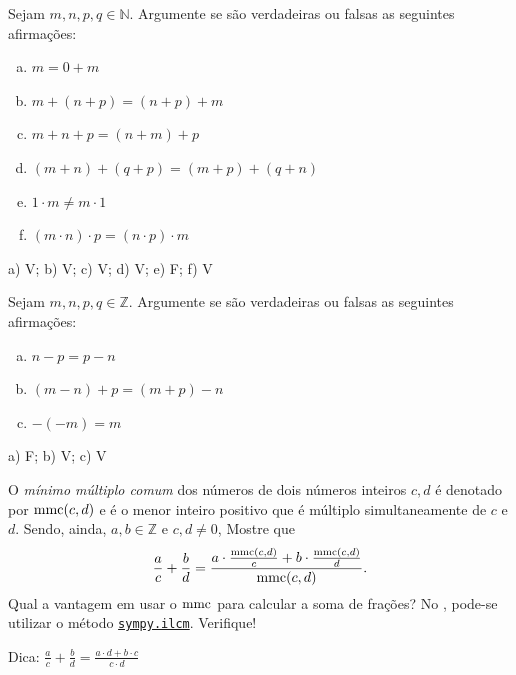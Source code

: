 \begin{exer}
  Sejam $m,n,p,q\in\mathbb{N}$. Argumente se são verdadeiras ou falsas as seguintes afirmações:
  \begin{enumerate}[a)]
  \item $m = 0 + m$
  \item $m + (n + p) = (n + p) + m$
  \item $m + n + p = (n + m) + p$
  \item $(m+n) + (q + p) = (m + p) + (q + n)$
  \item $1\cdot m \neq m\cdot 1$
  \item $(m\cdot n)\cdot p = (n\cdot p)\cdot m$
  \end{enumerate}
\end{exer}
\begin{resp}
  a) V; b) V; c) V; d) V; e) F; f) V
\end{resp}

\begin{exer}
  Sejam $m,n,p,q\in\mathbb{Z}$. Argumente se são verdadeiras ou falsas as seguintes afirmações:
  \begin{enumerate}[a)]
  \item $n - p = p - n$
  \item $(m - n) + p = (m + p) - n$
  \item $-(-m) = m$
  \end{enumerate}
\end{exer}
\begin{resp}
  a) F; b) V; c) V
\end{resp}

\begin{exer}
  O \emph{mínimo múltiplo comum} dos números de dois números inteiros $c,d$ é denotado por $\operatorname{mmc}(c,d)$ e é o menor inteiro positivo que é múltiplo simultaneamente de $c$ e $d$. Sendo, ainda, $a,b\in\mathbb{Z}$ e $c,d\neq 0$, Mostre que
  \begin{equation}
    \frac{a}{c} + \frac{b}{d} = \frac{a\cdot\frac{\operatorname{mmc}(c,d)}{c}+b\cdot\frac{\operatorname{mmc}(c,d)}{d}}{\operatorname{mmc}(c,d)}.
  \end{equation}
  Qual a vantagem em usar o $\operatorname{mmc}$ para calcular a soma de frações?
  \ifispython
  No {\sympy}, pode-se utilizar o método \href{https://docs.sympy.org/latest/modules/core.html?highlight=lcm#ilcm}{\lstinline+sympy.ilcm+}. Verifique!
  \fi
\end{exer}
\begin{resp}
  Dica: $\displaystyle \frac{a}{c} + \frac{b}{d} = \frac{a\cdot d + b\cdot c}{c\cdot d}$
\end{resp}

